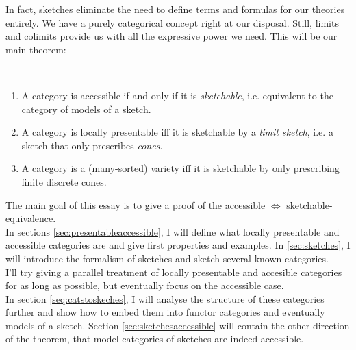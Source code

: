 In fact, sketches eliminate the need to define terms and formulas for our theories entirely. We have a purely categorical concept right at our disposal. Still, limits and colimits provide us with all the expressive power we need. This will be our main theorem:

\begin{Theorem}[Sketchability]\
\begin{enumerate}
\item A category is accessible if and only if it is \emph{sketchable}, i.e. equivalent to the category of models of a sketch. 

\item A category is locally presentable iff it is sketchable by a \emph{limit sketch}, i.e. a sketch that only prescribes \emph{cones}.

\item A category is a (many-sorted) variety iff it is sketchable by only prescribing finite discrete cones.
\end{enumerate}
\end{Theorem}

The main goal of this essay is to give a proof of the accessible $\Leftrightarrow$ sketchable-equivalence. \\

 In sections \ref{sec:presentableaccessible}, I will define what locally presentable and accessible categories are and give first properties and examples. In \ref{sec:sketches}, I will introduce the formalism of sketches and sketch several known categories. \\

I'll try giving a parallel treatment of locally presentable and accesible categories for as long as possible, but eventually focus on the accessible case. \\

In section \ref{seq:catstoskeches}, I will analyse the structure of these categories further and show how to embed them into functor categories and eventually models of a sketch. Section \ref{sec:sketchesaccessible} will contain the other direction of the theorem, that model categories of sketches are indeed accessible.